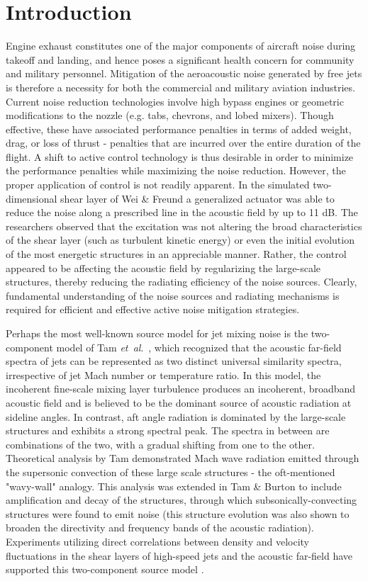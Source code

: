 \documentclass[english]{aiaa-tc}
\newcommand*{\etal}{\textit{et~al}.\ }
\begin{document}
\section{Introduction}
Engine exhaust constitutes one of the major components of aircraft noise during takeoff and landing, and hence poses a significant health concern for community and military personnel. 
Mitigation of the aeroacoustic noise generated by free jets is therefore a necessity for both the commercial and military aviation industries. 
Current noise reduction technologies involve high bypass engines or geometric modifications to the nozzle (e.g. tabs, chevrons, and lobed mixers). 
Though effective, these have associated performance penalties in terms of added weight, drag, or loss of thrust - penalties that are incurred over the entire duration of the flight. 
A shift to active control technology is thus desirable in order to minimize the performance penalties while maximizing the noise reduction. 
However, the proper application of control is not readily apparent. 
In the simulated two-dimensional shear layer of Wei \& Freund \cite{Wei2006} a generalized actuator was able to reduce the noise along a prescribed line in the acoustic field by up to 11 dB. 
The researchers observed that the excitation was not altering the broad characteristics of the shear layer (such as turbulent kinetic energy) or even the initial evolution of the most energetic structures in an appreciable manner. 
Rather, the control appeared to be affecting the acoustic field by regularizing the large-scale structures, thereby reducing the radiating efficiency of the noise sources. 
Clearly, fundamental understanding of the noise sources and radiating mechanisms is required for efficient and effective active noise mitigation strategies.

Perhaps the most well-known source model for jet mixing noise is the two-component model of Tam \etal \cite{Tam1996}, which recognized that the acoustic far-field spectra of jets can be represented as two distinct universal similarity spectra, irrespective of jet Mach number or temperature ratio. 
In this model, the incoherent fine-scale mixing layer turbulence produces an incoherent, broadband acoustic field and is believed to be the dominant source of acoustic radiation at sideline angles. 
In contrast, aft angle radiation is dominated by the large-scale structures and exhibits a strong spectral peak. 
The spectra in between are combinations of the two, with a gradual shifting from one to the other. 
Theoretical analysis by Tam \cite{Tam1971} demonstrated Mach wave radiation emitted through the supersonic convection of these large scale structures - the oft-mentioned "wavy-wall" analogy. 
This analysis was extended in Tam \& Burton \cite{Tam1984} to include amplification and decay of the structures, through which subsonically-convecting structures were found to emit noise (this structure evolution was also shown to broaden the directivity and frequency bands of the acoustic radiation). 
Experiments utilizing direct correlations between density and velocity fluctuations in the shear layers of high-speed jets and the acoustic far-field have supported this two-component source model \cite{Panda2002,Panda2005b}.
\end{document}
